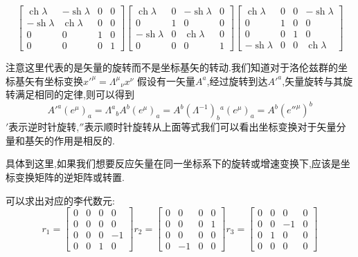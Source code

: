\documentclass[../main.tex]{subfiles}
\begin{document}
      $$\begin{bmatrix}
      \operatorname{ch} \lambda & -\operatorname{sh} \lambda & 0 & 0 \\
      -\operatorname{sh} \lambda & \operatorname{ch} \lambda & 0 & 0 \\
      0 & 0 & 1 & 0 \\
      0 & 0 & 0 & 1
      \end{bmatrix}
      \begin{bmatrix}
      \operatorname{ch} \lambda & 0 & -\operatorname{sh} \lambda & 0 \\
      0 & 1 & 0 & 0 \\
      -\operatorname{sh} \lambda & 0 & \operatorname{ch} \lambda & 0 \\
      0 & 0 & 0 & 1
      \end{bmatrix}
      \begin{bmatrix}
      \operatorname{ch} \lambda & 0 & 0 & -\operatorname{sh} \lambda \\
      0 & 1 & 0 & 0 \\
      0 & 0 & 1 & 0 \\
      -\operatorname{sh} \lambda & 0 & 0 & \operatorname{ch} \lambda
      \end{bmatrix}$$
      \begin{note}
      注意这里代表的是矢量的旋转而不是坐标基矢的转动.我们知道对于洛伦兹群的坐标基矢有坐标变换$x'^\mu = \Lambda^\mu{}_\nu x^\nu$
      假设有一矢量$A^a$,经过旋转到达$A'^a$,矢量旋转与其旋转满足相同的定律,则可以得到
     $$A'^a(e^\mu)_a = \Lambda^a{}_b A^b(e^\mu)_a= A^b(\Lambda^{-1})_b{}^a(e^\mu)_a= A^b(e''^\mu)^b$$
     $'$表示逆时针旋转,$''$表示顺时针旋转从上面等式我们可以看出坐标变换对于矢量分量和基矢的作用是相反的.

     具体到这里,如果我们想要反应矢量在同一坐标系下的旋转或增速变换下,应该是坐标变换矩阵的逆矩阵或转置.
      \end{note}
      可以求出对应的李代数元:
 $$r_1=\begin{bmatrix}
	0 & 0 & 0 & 0  \\
	0 & 0 & 0 & 0  \\
	0 & 0 & 0 & -1 \\
	0 & 0 & 1 & 0
\end{bmatrix}
r_2=\begin{bmatrix}
	0 & 0  & 0 & 0 \\
	0 & 0  & 0 & 1 \\
	0 & 0  & 0 & 0 \\
	0 & -1 & 0 & 0
\end{bmatrix}
r_3=\begin{bmatrix}
	0 & 0 & 0  & 0 \\
	0 & 0 & -1 & 0 \\
	0 & 1 & 0  & 0 \\
	0 & 0 & 0  & 0
\end{bmatrix}$$
\end{document}
